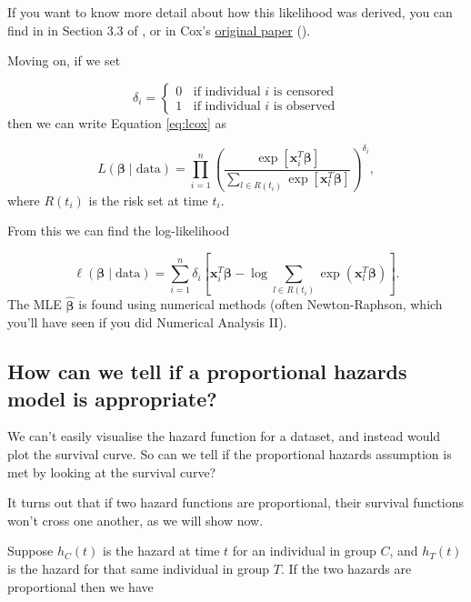 \documentclass[
  openany]{book}
\theoremstyle{definition}
\theoremstyle{definition}
\theoremstyle{definition}
\theoremstyle{definition}
\theoremstyle{remark}
\begin{document}
If you want to know more detail about how this likelihood was derived, you can find in in Section 3.3 of \citet{collett_surv}, or in Cox's \href{https://www.jstor.org/stable/pdf/2985181.pdf}{original paper} (\citet{cox1972regression}).

Moving on, if we set

\[
\delta_i = 
\begin{cases}
0\;\;\text{ if individual }i\text{ is censored}\\
1\;\;\text{ if individual }i\text{ is observed}
\end{cases}
\]
then we can write Equation \eqref{eq:lcox} as

\[L\left(\boldsymbol\beta\mid{\text{data}}\right) =   \prod\limits_{i=1}^n\left(\frac{\exp\left[\mathbf{x}_i^T\boldsymbol\beta\right]}{\sum\limits_{l\in R\left(t_i\right)}{\exp\left[\mathbf{x}_l^T\boldsymbol\beta\right]}}\right)^{\delta_i},\]
where \(R\left(t_i\right)\) is the risk set at time \(t_i\).

From this we can find the log-likelihood

\[\ell\left(\boldsymbol\beta\mid{\text{data}}\right) = \sum\limits_{i=1}^n \delta_i\left[\mathbf{x}_i^T\boldsymbol\beta - \log\sum\limits_{l\in R\left(t_i\right)}\exp\left(\mathbf{x}_l^T\boldsymbol\beta\right)\right].\]
The MLE \(\hat{\boldsymbol\beta}\) is found using numerical methods (often Newton-Raphson, which you'll have seen if you did Numerical Analysis II).

\subsection*{How can we tell if a proportional hazards model is appropriate?}\label{how-can-we-tell-if-a-proportional-hazards-model-is-appropriate}

We can't easily visualise the hazard function for a dataset, and instead would plot the survival curve. So can we tell if the proportional hazards assumption is met by looking at the survival curve?

It turns out that if two hazard functions are proportional, their survival functions won't cross one another, as we will show now.

Suppose \(h_C\left(t\right)\) is the hazard at time \(t\) for an individual in group \(C\), and \(h_T\left(t\right)\) is the hazard for that same individual in group \(T\). If the two hazards are proportional then we have
\end{document}
